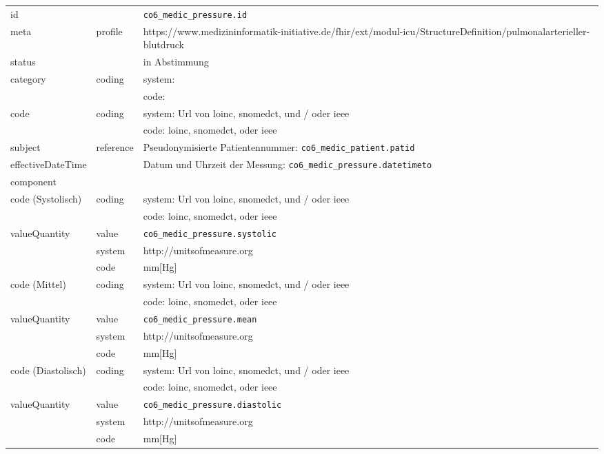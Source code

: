 \begin{longtable}{|l|l|p{7.5cm}|}
        \hline
        \rowcolor{lightgray} \multicolumn{3}{|l|}{Data Mapping (inhaltlich)} \\ \hline
        id &  & \texttt{co6\_medic\_pressure.id} \\ \hline
	meta & profile & https://www.medizininformatik-initiative.de/fhir/ext/modul-icu/StructureDefinition/pulmonalarterieller-blutdruck \\ \hline 
	status &  & in Abstimmung  \\ \hline 
	category & coding & system:  \\ 
\cline{3-3}
        & & code:  \\ \hline
        code & coding & system: Url von \ac{loinc}, \ac{snomedct}, und / oder \ac{ieee} \\
        \cline{3-3}
         &  & code: \ac{loinc}, \ac{snomedct}, oder \ac{ieee} \\ \hline
        subject & reference & Pseudonymisierte Patientennummer: \texttt{co6\_medic\_patient.patid} \\ \hline
        effectiveDateTime & & Datum und Uhrzeit der Messung:  \texttt{co6\_medic\_pressure.datetimeto} \\ \hline
	\multicolumn{3}{|l|}{component} \\ \hline
	code (Systolisch)  & coding & system: Url von \ac{loinc}, \ac{snomedct}, und / oder \ac{ieee} \\ 
	\cline{3-3} 
	&  & code: \ac{loinc}, \ac{snomedct}, oder \ac{ieee} \\ \hline	
	valueQuantity & value & \texttt{co6\_medic\_pressure.systolic} \\
	\cline{2-3}
	& system & http://unitsofmeasure.org \\ 
	\cline{2-3}
	& code & mm[Hg] \\ \hline
	code (Mittel)  & coding & system: Url von \ac{loinc}, \ac{snomedct}, und / oder \ac{ieee} \\ 
	\cline{3-3} 
	&  & code: \ac{loinc}, \ac{snomedct}, oder \ac{ieee} \\ \hline	
	valueQuantity & value & \texttt{co6\_medic\_pressure.mean} \\
	\cline{2-3}
	& system & http://unitsofmeasure.org \\ 
	\cline{2-3}
	& code &  mm[Hg] \\ \hline
	code (Diastolisch)  & coding & system: Url von \ac{loinc}, \ac{snomedct}, und / oder \ac{ieee} \\ 
	\cline{3-3} 
	&  & code: \ac{loinc}, \ac{snomedct}, oder \ac{ieee} \\ \hline	
	valueQuantity & value & \texttt{co6\_medic\_pressure.diastolic} \\
	\cline{2-3}
	& system & http://unitsofmeasure.org \\ 
	\cline{2-3}
	& code & mm[Hg] \\ \hline
\end{longtable}
